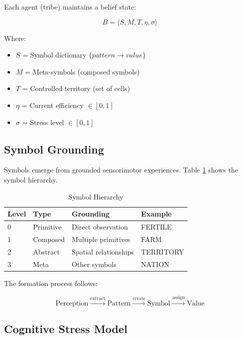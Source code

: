 \documentclass[11pt,a4paper]{article}
\begin{document}
Each agent (tribe) maintains a belief state:

\begin{equation}
B = \langle S, M, T, \eta, \sigma \rangle
\end{equation}

Where:
\begin{itemize}
    \item $S$ = Symbol dictionary $\{pattern \rightarrow value\}$
    \item $M$ = Meta-symbols (composed symbols)
    \item $T$ = Controlled territory (set of cells)
    \item $\eta$ = Current efficiency $\in [0, 1]$
    \item $\sigma$ = Stress level $\in [0, 1]$
\end{itemize}

\subsection{Symbol Grounding}

Symbols emerge from grounded sensorimotor experiences. Table \ref{tab:symbols} shows the symbol hierarchy.

\begin{table}[htbp]
\centering
\caption{Symbol Hierarchy}
\label{tab:symbols}
\begin{tabular}{@{}llll@{}}
\toprule
Level & Type & Grounding & Example \\
\midrule
0 & Primitive & Direct observation & FERTILE \\
1 & Composed & Multiple primitives & FARM \\
2 & Abstract & Spatial relationships & TERRITORY \\
3 & Meta & Other symbols & NATION \\
\bottomrule
\end{tabular}
\end{table}

The formation process follows:

\begin{equation}
\text{Perception} \xrightarrow{\text{extract}} \text{Pattern} \xrightarrow{\text{create}} \text{Symbol} \xrightarrow{\text{assign}} \text{Value}
\end{equation}

\subsection{Cognitive Stress Model}
\end{document}
